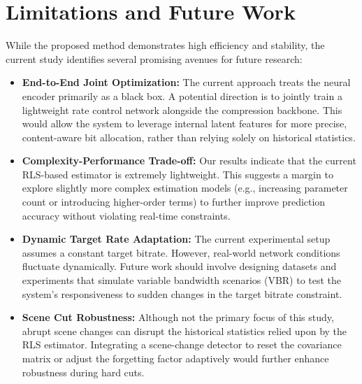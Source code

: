 \section{Limitations and Future Work}
While the proposed method demonstrates high efficiency and stability, the current study identifies several promising avenues for future research:

\begin{itemize}
    \item \textbf{End-to-End Joint Optimization:} The current approach treats the neural encoder primarily as a black box. A potential direction is to jointly train a lightweight rate control network alongside the compression backbone. This would allow the system to leverage internal latent features for more precise, content-aware bit allocation, rather than relying solely on historical statistics.

    \item \textbf{Complexity-Performance Trade-off:} Our results indicate that the current RLS-based estimator is extremely lightweight. This suggests a margin to explore slightly more complex estimation models (e.g., increasing parameter count or introducing higher-order terms) to further improve prediction accuracy without violating real-time constraints.

    \item \textbf{Dynamic Target Rate Adaptation:} The current experimental setup assumes a constant target bitrate. However, real-world network conditions fluctuate dynamically. Future work should involve designing datasets and experiments that simulate variable bandwidth scenarios (VBR) to test the system's responsiveness to sudden changes in the target bitrate constraint.

    \item \textbf{Scene Cut Robustness:} Although not the primary focus of this study, abrupt scene changes can disrupt the historical statistics relied upon by the RLS estimator. Integrating a scene-change detector to reset the covariance matrix or adjust the forgetting factor adaptively would further enhance robustness during hard cuts.
\end{itemize}